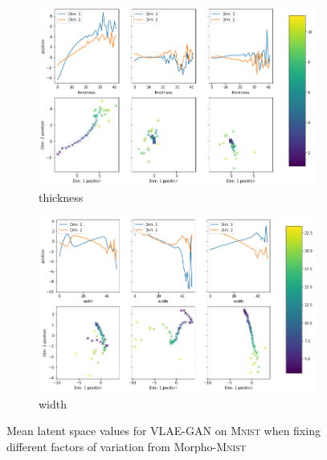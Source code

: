 \documentclass[11pt,a4paper]{article}
\begin{document}
\begin{figure}[H]
\begin{subfigure}{.48\textwidth}
\includegraphics[width=\textwidth]{images/latent_space_traversals/vlae_gan_mnist_morpho_latent_space_values_thickness.png}
\caption{thickness}
\end{subfigure}
\begin{subfigure}{.48\textwidth}
\includegraphics[width=\textwidth]{images/latent_space_traversals/vlae_gan_mnist_morpho_latent_space_values_width.png}
\caption{width}
\end{subfigure}
\caption{Mean latent space values for \ac{VLAE}-\ac{GAN} on \textsc{Mnist} when fixing different factors of variation from Morpho-\textsc{Mnist}}
\end{figure}
\end{document}
